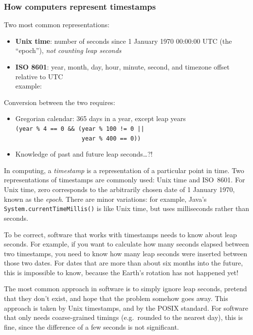 \begin{frame}
    \label{s:time-representation}
    \frametitle{How computers represent timestamps}
    Two most common representations:
    \begin{itemize}
        \item \textbf{Unix time}: number of seconds since 1 January 1970 00:00:00 UTC (the ``epoch''), \emph{not counting leap seconds}
        \item \textbf{ISO 8601}: year, month, day, hour, minute, second, and timezone offset relative to UTC\\
            example: \texttt{\timestampexample}\\[1em]
    \end{itemize}\pause
    Conversion between the two requires:
    \begin{itemize}
        \item Gregorian calendar: 365 days in a year, except leap years\\
            \texttt{(year \% 4 == 0 \&\& (year \% 100 != 0 ||}\\
            \texttt{~~~~~~~~~~~~~~~~~~~year \% 400 == 0))}
        \item Knowledge of past and future leap seconds\dots?!
    \end{itemize}
\end{frame}
\label{l:time-representation}

In computing, a \emph{timestamp} is a representation of a particular point in time.
Two representations of timestamps are commonly used: Unix time and ISO~8601.
For Unix time, zero corresponds to the arbitrarily chosen date of 1 January 1970, known as the \emph{epoch}.
There are minor variations: for example, Java's \verb|System.currentTimeMillis()| is like Unix time, but uses milliseconds rather than seconds.

To be correct, software that works with timestamps needs to know about leap seconds.
For example, if you want to calculate how many seconds elapsed between two timestamps, you need to know how many leap seconds were inserted between those two dates.
For dates that are more than about six months into the future, this is impossible to know, because the Earth's rotation has not happened yet!

The most common approach in software is to simply ignore leap seconds, pretend that they don't exist, and hope that the problem somehow goes away.
This approach is taken by Unix timestamps, and by the POSIX standard.
For software that only needs coarse-grained timings (e.g.\ rounded to the nearest day), this is fine, since the difference of a few seconds is not significant.

